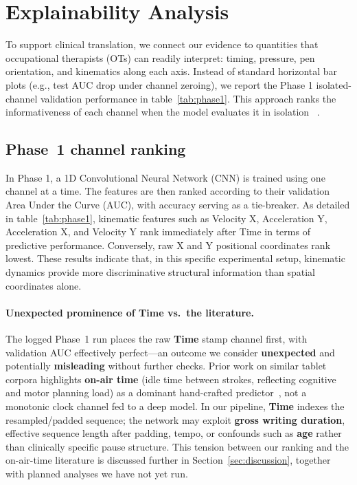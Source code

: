 \documentclass{article}
\begin{document}
\section{Explainability Analysis}
\label{sec:explainability}

To support clinical translation, we connect our evidence to quantities that occupational therapists (OTs) can readily interpret: timing, pressure, pen orientation, and kinematics along each axis. Instead of standard horizontal bar plots (e.g., test AUC drop under channel zeroing), we report the Phase 1 isolated-channel validation performance in table~\ref{tab:phase1}. This approach ranks the informativeness of each channel when the model evaluates it in isolation ~\cite{arrieta2020}.

\subsection{Phase~1 channel ranking }

In Phase 1, a 1D Convolutional Neural Network (CNN) is trained using one channel at a time. The features are then ranked according to their validation Area Under the Curve (AUC), with accuracy serving as a tie-breaker. As detailed in table~\ref{tab:phase1}, kinematic features such as Velocity X, Acceleration Y, Acceleration X, and Velocity Y rank immediately after Time in terms of predictive performance. Conversely, raw X and Y positional coordinates rank lowest. These results indicate that, in this specific experimental setup, kinematic dynamics provide more discriminative structural information than spatial coordinates alone.

\paragraph{Unexpected prominence of \textbf{Time} vs.\ the literature.} The logged Phase~1 run places the raw \textbf{Time} stamp channel first, with validation AUC effectively perfect---an outcome we consider \textbf{unexpected} and potentially \textbf{misleading} without further checks. Prior work on similar tablet corpora highlights \textbf{on-air time} (idle time between strokes, reflecting cognitive and motor planning load) as a dominant hand-crafted predictor~\cite{kunhoth2022}, not a monotonic clock channel fed to a deep model. In our pipeline, \textbf{Time} indexes the resampled/padded sequence; the network may exploit \textbf{gross writing duration}, effective sequence length after padding, tempo, or confounds such as \textbf{age} rather than clinically specific pause structure. This tension between our ranking and the on-air-time literature is discussed further in Section~\ref{sec:discussion}, together with planned analyses we have not yet run.
\end{document}
